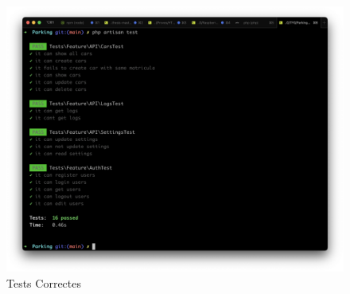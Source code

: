 \begin{figure}[H]
    \begin{center}
    \includegraphics[scale=0.20]{Fotos/testsComprovacio.png}
    \end{center}
    \caption{Tests Correctes}
    \label{fig:register_photo}
\end{figure}
